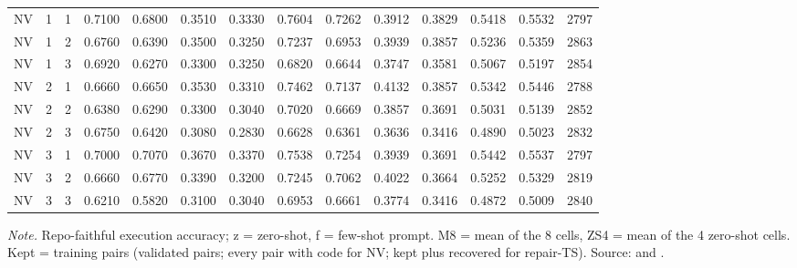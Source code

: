 {\begin{longtable}{@{}lccrrrrrrrrrrr@{}}
\midrule
NV & 1 & 1 & 0.7100 & 0.6800 & 0.3510 & 0.3330 & 0.7604 & 0.7262 & 0.3912 & 0.3829 & 0.5418 & 0.5532 & 2797\\
NV & 1 & 2 & 0.6760 & 0.6390 & 0.3500 & 0.3250 & 0.7237 & 0.6953 & 0.3939 & 0.3857 & 0.5236 & 0.5359 & 2863\\
NV & 1 & 3 & 0.6920 & 0.6270 & 0.3300 & 0.3250 & 0.6820 & 0.6644 & 0.3747 & 0.3581 & 0.5067 & 0.5197 & 2854\\
NV & 2 & 1 & 0.6660 & 0.6650 & 0.3530 & 0.3310 & 0.7462 & 0.7137 & 0.4132 & 0.3857 & 0.5342 & 0.5446 & 2788\\
NV & 2 & 2 & 0.6380 & 0.6290 & 0.3300 & 0.3040 & 0.7020 & 0.6669 & 0.3857 & 0.3691 & 0.5031 & 0.5139 & 2852\\
NV & 2 & 3 & 0.6750 & 0.6420 & 0.3080 & 0.2830 & 0.6628 & 0.6361 & 0.3636 & 0.3416 & 0.4890 & 0.5023 & 2832\\
NV & 3 & 1 & 0.7000 & 0.7070 & 0.3670 & 0.3370 & 0.7538 & 0.7254 & 0.3939 & 0.3691 & 0.5442 & 0.5537 & 2797\\
NV & 3 & 2 & 0.6660 & 0.6770 & 0.3390 & 0.3200 & 0.7245 & 0.7062 & 0.4022 & 0.3664 & 0.5252 & 0.5329 & 2819\\
NV & 3 & 3 & 0.6210 & 0.5820 & 0.3100 & 0.3040 & 0.6953 & 0.6661 & 0.3774 & 0.3416 & 0.4872 & 0.5009 & 2840\\
\end{longtable}
}
\vspace{-0.6\baselineskip}
{\footnotesize\color{slate}\textit{Note.} Repo-faithful execution accuracy; z = zero-shot, f = few-shot prompt. M8 = mean of the 8 cells, ZS4 = mean of the 4 zero-shot cells. Kept = training pairs (validated pairs; every pair with code for NV; kept plus recovered for repair-TS). Source:  and .\par}
\medskip
